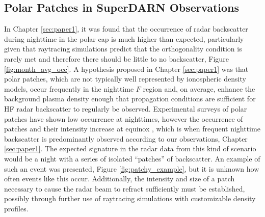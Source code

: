 \subsection{Polar Patches in SuperDARN Observations}
\label{sec:fw_patches}
In Chapter \ref{sec:paper1}, it was found that the occurrence of radar backscatter during nighttime in the polar cap is much higher than expected, particularly given that raytracing simulations predict that the orthogonality condition is rarely met and therefore there should be little to no backscatter, Figure \ref{fig:month_avg_occ}.  A hypothesis proposed in Chapter \ref{sec:paper1} was that polar patches, which are not typically well represented by ionospheric density models, occur frequently in the nighttime \(F\) region and, on average, enhance the background plasma density enough that propagation conditions are sufficient for HF radar backscatter to regularly be observed.  Experimental surveys of polar patches have shown low occurrence at nighttimes, however the occurrence of patches and their intensity increase at equinox \citep{Rodger1996}, which is when frequent nighttime backscatter is predominantly observed according to our observations, Chapter \ref{sec:paper1}.  The expected signature in the radar data from this kind of scenario would be a night with a series of isolated ``patches'' of backscatter.  An example of such an event was presented, Figure \ref{fig:patchy_example}, but it is unknown how often events like this occur.  Additionally, the intensity and size of a patch necessary to cause the radar beam to refract sufficiently must be established, possibly through further use of raytracing simulations with customizable density profiles.

